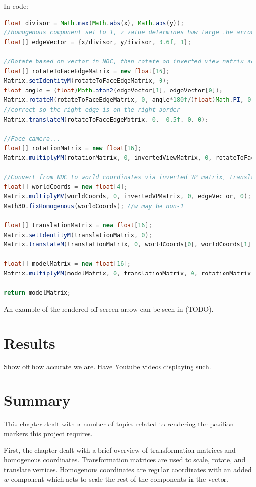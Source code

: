 In code:

\begin{lstlisting}[language=Java]
float divisor = Math.max(Math.abs(x), Math.abs(y));
//homogenous component set to 1, z value determines how large the arrow is later
float[] edgeVector = {x/divisor, y/divisor, 0.6f, 1}; 

//Rotate based on vector in NDC, then rotate on inverted view matrix so it faces the camera
float[] rotateToFaceEdgeMatrix = new float[16];
Matrix.setIdentityM(rotateToFaceEdgeMatrix, 0);
float angle = (float)Math.atan2(edgeVector[1], edgeVector[0]);
Matrix.rotateM(rotateToFaceEdgeMatrix, 0, angle*180f/(float)Math.PI, 0, 0, 1f);
//correct so the right edge is on the right border
Matrix.translateM(rotateToFaceEdgeMatrix, 0, -0.5f, 0, 0); 

//Face camera...
float[] rotationMatrix = new float[16];
Matrix.multiplyMM(rotationMatrix, 0, invertedViewMatrix, 0, rotateToFaceEdgeMatrix, 0);

//Convert from NDC to world coordinates via inverted VP matrix, translate matrix to that
float[] worldCoords = new float[4];
Matrix.multiplyMV(worldCoords, 0, invertedVPMatrix, 0, edgeVector, 0);
Math3D.fixHomogenous(worldCoords); //w may be non-1

float[] translationMatrix = new float[16];
Matrix.setIdentityM(translationMatrix, 0);
Matrix.translateM(translationMatrix, 0, worldCoords[0], worldCoords[1], worldCoords[2]);

float[] modelMatrix = new float[16];
Matrix.multiplyMM(modelMatrix, 0, translationMatrix, 0, rotationMatrix, 0);

return modelMatrix;
\end{lstlisting}

An example of the rendered off-screen arrow can be seen in (TODO).

\section{Results}
Show off how accurate we are. Have Youtube videos displaying such.

\section{Summary}
This chapter dealt with a number of topics related to rendering the position markers this project requires.

First, the chapter dealt with a brief overview of transformation matrices and homogenous coordinates. Transformation matrices are used to scale, rotate, and translate vertices. Homogenous coordinates are regular coordinates with an added $w$ component which acts to scale the rest of the components in the vector.

